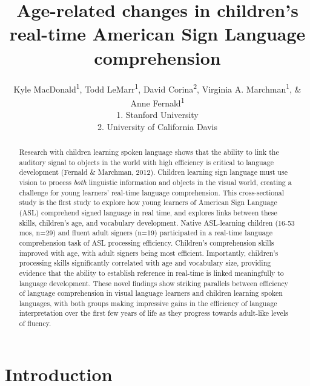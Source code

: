 \documentclass[12pt,]{article}
\title{Age-related changes in children's real-time American Sign Language
comprehension}
\author{Kyle MacDonald\textsuperscript{1}, Todd LeMarr\textsuperscript{1}, David
Corina\textsuperscript{2}, Virginia A. Marchman\textsuperscript{1}, \&
Anne Fernald\textsuperscript{1}\\1. Stanford University\\2. University
of California Davis}
\date{}
\begin{document}
\maketitle

\begin{abstract}
Research with children learning spoken language shows that the ability
to link the auditory signal to objects in the world with high efficiency
is critical to language development (Fernald \& Marchman, 2012).
Children learning sign language must use vision to process \emph{both}
linguistic information and objects in the visual world, creating a
challenge for young learners' real-time language comprehension. This
cross-sectional study is the first study to explore how young learners
of American Sign Language (ASL) comprehend signed language in real time,
and explores links between these skills, children's age, and vocabulary
development. Native ASL-learning children (16-53 mos, n=29) and fluent
adult signers (n=19) participated in a real-time language comprehension
task of ASL processing efficiency. Children's comprehension skills
improved with age, with adult signers being most efficient. Importantly,
children's processing skills significantly correlated with age and
vocabulary size, providing evidence that the ability to establish
reference in real-time is linked meaningfully to language development.
These novel findings show striking parallels between efficiency of
language comprehension in visual language learners and children learning
spoken languages, with both groups making impressive gains in the
efficiency of language interpretation over the first few years of life
as they progress towards adult-like levels of fluency.
\end{abstract}

\newpage

\section{Introduction}\label{introduction}
\end{document}
